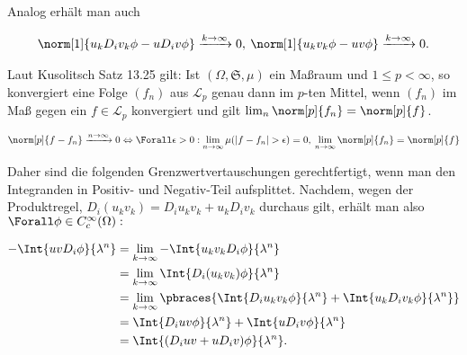 \begin{solution}
Analog erhält man auch

\begin{align*}
  \norm[1]{u_k D_i v_k \phi - u D_i v \phi}
  \xrightarrow{k \to \infty} 0, \:
  \norm[1]{u_k v_k \phi - uv \phi}
  \xrightarrow{k \to \infty} 0.
\end{align*}

Laut Kusolitsch Satz 13.25 gilt: Ist $(\Omega, \mathfrak{S}, \mu)$ ein Maßraum und $1 \leq p < \infty$, so konvergiert eine Folge $(f_n)$ aus $\mathcal{L}_p$ genau dann im $p$-ten Mittel, wenn $(f_n)$ im Maß gegen ein $f \in \mathcal{L}_p$ konvergiert und gilt $\lim_n \norm[p]{f_n} = \norm[p]{f}$.

\begin{align*}
  \norm[p]{f - f_n}
  \xrightarrow{n \to \infty} 0
  \Leftrightarrow
  \Forall \epsilon > 0:
  \lim_{n \to \infty} \mu(|f - f_n| > \epsilon) = 0, \:
  \lim_{n \to \infty} \norm[p]{f_n} = \norm[p]{f}
\end{align*}

Daher sind die folgenden Grenzwertvertauschungen gerechtfertigt, wenn man den Integranden in Positiv- und Negativ-Teil aufsplittet. Nachdem, wegen der Produktregel, $D_i(u_k v_k) = D_i u_k v_k + u_k D_i v_k$ durchaus gilt, erhält man also $\Forall \phi \in C_c^\infty(\Omega):$

\begin{align*}
  - \Int{uv D_i \phi}{\lambda^n}
  & = \lim_{k \to \infty} - \Int{u_k v_k D_i \phi}{\lambda^n} \\
  & = \lim_{k \to \infty} \Int{D_i(u_k v_k) \phi}{\lambda^n} \\
  & = \lim_{k \to \infty}
      \pbraces
      {
        \Int{D_i u_k v_k \phi}{\lambda^n} +
        \Int{u_k D_i v_k \phi}{\lambda^n}
      } \\
  & = \Int{D_i u v \phi}{\lambda^n} +
      \Int{u D_i v \phi}{\lambda^n} \\
  & = \Int{(D_i u v + u D_i v) \phi}{\lambda^n}.
\end{align*}

\end{solution}


